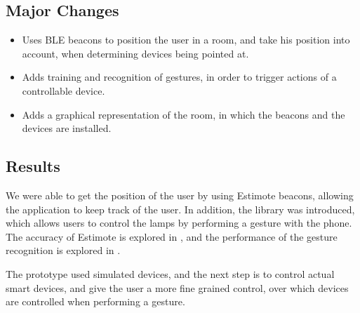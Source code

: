 \subsection{Major Changes}
\begin{itemize}
\item Uses BLE beacons to position the user in a room, and take his position into account, when determining devices being pointed at.
\item Adds training and recognition of gestures, in order to trigger actions of a controllable device.
\item Adds a graphical representation of the room, in which the beacons and the devices are installed.
\end{itemize}

\subsection{Results}

We were able to get the position of the user by using Estimote beacons, 
allowing the application to keep track of the user. 
In addition, the \threedollar library was introduced, 
which allows users to control the lamps by performing a gesture with the phone.
The accuracy of Estimote is explored in , 
and the performance of the gesture recognition is explored in .

The prototype used simulated devices, 
and the next step is to control actual smart devices, 
and give the user a more fine grained control, 
over which devices are controlled when performing a gesture.

